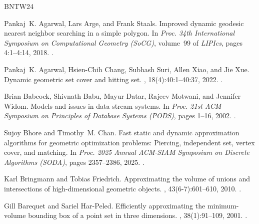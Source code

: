 \documentclass[11pt]{article}
\begin{document}
\newcommand{\etalchar}[1]{$^{#1}$}
\begin{thebibliography}{BNTW24}

Pankaj~K. Agarwal, Lars Arge, and Frank Staals.
\newblock Improved dynamic geodesic nearest neighbor searching in a simple
  polygon.
\newblock In {\em Proc. 34th International Symposium on Computational Geometry
  (SoCG)}, volume~99 of {\em LIPIcs}, pages 4:1--4:14, 2018.
\newblock \href {https://doi.org/10.4230/LIPICS.SOCG.2018.4}
  {}.

\bibitem[ACS{\etalchar{+}}22]{AgarwalCSXX22}
Pankaj~K. Agarwal, Hsien{-}Chih Chang, Subhash Suri, Allen Xiao, and Jie Xue.
\newblock Dynamic geometric set cover and hitting set.
, 18(4):40:1--40:37, 2022.
\newblock \href {https://doi.org/10.1145/3551639} {}.

\bibitem[BBD{\etalchar{+}}02]{babcock2002models}
Brian Babcock, Shivnath Babu, Mayur Datar, Rajeev Motwani, and Jennifer Widom.
\newblock Models and issues in data stream systems.
\newblock In {\em Proc. 21st ACM Symposium on Principles of Database Systems
  (PODS)}, pages 1--16, 2002.
\newblock \href {https://doi.org/10.1145/543613.543615}
  {}.

Sujoy Bhore and Timothy~M. Chan.
\newblock Fast static and dynamic approximation algorithms for geometric
  optimization problems: Piercing, independent set, vertex cover, and matching.
\newblock In {\em Proc. 2025 Annual {ACM-SIAM} Symposium on Discrete Algorithms
  ({SODA})}, pages 2357--2386, 2025.
\newblock \href {https://doi.org/10.1137/1.9781611978322.79}
  {}.

Karl Bringmann and Tobias Friedrich.
\newblock Approximating the volume of unions and intersections of
  high-dimensional geometric objects.
, 43(6-7):601--610, 2010.
\newblock \href {https://doi.org/10.1016/J.COMGEO.2010.03.004}
  {}.

Gill Barequet and Sariel Har{-}Peled.
\newblock Efficiently approximating the minimum-volume bounding box of a point
  set in three dimensions.
, 38(1):91--109, 2001.
\newblock \href {https://doi.org/10.1006/JAGM.2000.1127}
  {}.


\end{thebibliography}
\end{document}
